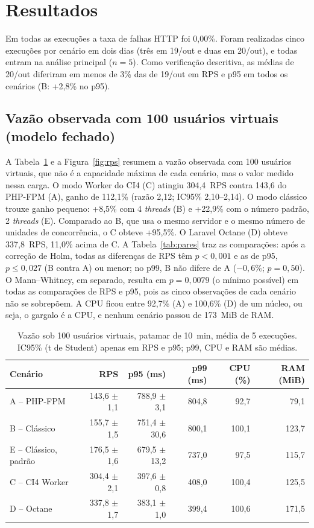 \section{Resultados}
Em todas as execuções a taxa de falhas HTTP foi 0,00\%. Foram realizadas cinco execuções por cenário em dois dias (três em 19/out e duas em 20/out), e todas entram na análise principal ($n=5$). Como verificação descritiva, as médias de 20/out diferiram em menos de 3\% das de 19/out em RPS e p95 em todos os cenários (B: +2,8\% no p95).

\subsection{Vazão observada com 100 usuários virtuais (modelo fechado)}
A Tabela~\ref{tab:global} e a Figura~\ref{fig:rps} resumem a vazão observada com 100 usuários virtuais, que não é a capacidade máxima de cada cenário, mas o valor medido nessa carga. O modo Worker do CI4 (C) atingiu 304,4~RPS contra 143,6 do PHP-FPM (A), ganho de 112,1\% (razão 2,12; IC95\% 2,10--2,14). O modo clássico trouxe ganho pequeno: +8,5\% com 4 \textit{threads} (B) e +22,9\% com o número padrão, 2 \textit{threads} (E). Comparado ao B, que usa o mesmo servidor e o mesmo número de unidades de concorrência, o C obteve +95,5\%. O Laravel Octane (D) obteve 337,8~RPS, 11,0\% acima de C. A Tabela~\ref{tab:pares} traz as comparações: após a correção de Holm, todas as diferenças de RPS têm $p<0{,}001$ e as de p95, $p\le0{,}027$ (B contra A) ou menor; no p99, B não difere de A ($-0{,}6\%$; $p=0{,}50$). O Mann--Whitney, em separado, resulta em $p=0{,}0079$ (o mínimo possível) em todas as comparações de RPS e p95, pois as cinco observações de cada cenário não se sobrepõem. A CPU ficou entre 92,7\% (A) e 100,6\% (D) de um núcleo, ou seja, o gargalo é a CPU, e nenhum cenário passou de 173~MiB de RAM.

\begin{table}[htb]
  \caption{Vazão sob 100 usuários virtuais, patamar de 10~min, média de 5 execuções. IC95\% (t de Student) apenas em RPS e p95; p99, CPU e RAM são médias.}
  \label{tab:global}
  \centering
  \footnotesize
  \setlength{\tabcolsep}{3pt}
  \begin{tabular}{lrrrrr}
    \toprule
    \textbf{Cenário} & \textbf{RPS} & \textbf{p95 (ms)} & \textbf{p99 (ms)} & \textbf{CPU (\%)} & \textbf{RAM (MiB)} \\
    \midrule
    A -- PHP-FPM & 143,6 $\pm$ 1,1 & 788,9 $\pm$ 3,1 & 804,8 & 92,7 & 79,1 \\
    B -- Clássico & 155,7 $\pm$ 1,5 & 751,4 $\pm$ 30,6 & 800,1 & 100,1 & 123,7 \\
    E -- Clássico, padrão & 176,5 $\pm$ 1,6 & 679,5 $\pm$ 13,2 & 737,0 & 97,5 & 115,7 \\
    C -- CI4 Worker & 304,4 $\pm$ 2,1 & 397,6 $\pm$ 0,8 & 408,0 & 100,4 & 125,5 \\
    D -- Octane & 337,8 $\pm$ 1,7 & 383,1 $\pm$ 1,0 & 399,4 & 100,6 & 171,5 \\
    \bottomrule
  \end{tabular}
\end{table}


